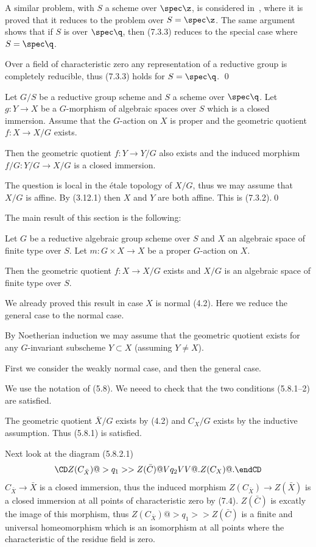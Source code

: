 A similar problem, with $S$ a scheme over $\spec \z$, is considered in\
\cite{Seshadri77, p.244}, where it is proved that it reduces to the problem
over $S=\spec\z$. The same argument shows that if $S$ is over $\spec \q$, then
(7.3.3) reduces to the special case where $S=\spec \q$.

Over  a field of characteristic zero any representation of a reductive group
is completely reducible, thus (7.3.3) holds for $S=\spec \q$. \qed\enddemo
\enddemo

 Let  $G/S$ be a
reductive group scheme and $S$  a scheme over $\spec \q$. Let $g:Y\to X$ be a
$G$-morphism of algebraic spaces over $S$ which is a closed immersion.
Assume that the  $G$-action on $X$ is proper and the geometric quotient $f:X\to
X/G$  exists.

Then the  geometric quotient $f:Y\to Y/G$  also exists
and the induced morphism  $f/G:Y/G\to X/G$ is  a closed immersion.
\endproclaim


\demop The question is local in the \'etale topology of $X/G$, thus we may
assume that $X/G$ is affine. By (3.12.1) then $X$ and $Y$ are both affine.
This is (7.3.2).\qed\enddemo

The main result of this section is the following:


 Let  $G$ be a reductive
algebraic group scheme    over $S$ and $X$ an algebraic
space  of finite type over $S$. Let $m:G\times X\to X$ be a proper $G$-action
on $X$.

Then the geometric quotient $f:X\to X/G$  exists  and $X/G$ is an
algebraic
space  of finite type over $S$.
\endproclaim

\demop We already proved this result in case $X$ is   normal (4.2). Here we
reduce the general case to the   normal case.

By Noetherian induction we may assume that the geometric quotient exists for
any $G$-invariant subscheme $Y\subset X$ (assuming $Y\neq X$).

First we consider
the weakly normal case, and then the general case.
\enddemo

 We use the notation
 of (5.8).  We neeed to check that the two conditions (5.8.1--2) are
satisfied.

The geometric quotient  $\bar X/G$ exists by (4.2) and
  $C_X/G$ exists by the inductive assumption.
Thus (5.8.1) is satisfied.

Next look at the diagram  (5.8.2.1)
$$
\CD
Z(C_{\bar X})@>q_1>>  Z(\bar C)\\
@Vq_2VV @.\\
Z(C_X) @.
\endCD
$$
$C_{\bar X}\to \bar X$  is a closed immersion, thus the induced morphism
$Z(C_{\bar X})\to Z(\bar X)$ is a closed immersion at all points of
characteristic zero by (7.4). $Z(\bar C)$ is excatly the image of this
morphism, thus
$Z(C_{\bar X})@>q_1>>  Z(\bar C)$ is a  finite and  universal homeomorphism
which is an isomorphism  at all points where the characteristic of the residue
field is zero.

